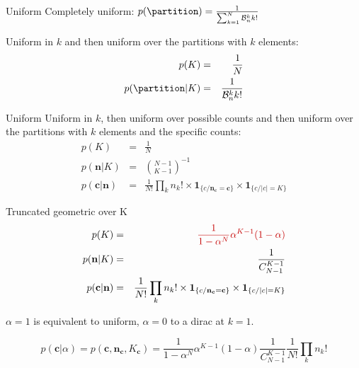 \documentclass[
  ignorenonframetext,
]{beamer}
\newcommand{\Ucolor}[1]{\textcolor[HTML]{c40000}{#1}}
\begin{document}
\begin{frame}{Uniform}
\protect\hypertarget{uniform}{}
Completely uniform:
\(p(\partition)=\frac{1}{\sum_{k=1}^N\mathcal{B}_n^k k!}\)

Uniform in \(k\) and then uniform over the partitions with \(k\)
elements: \begin{eqnarray}
p(K)&=&\frac{1}{N}\\
p(\partition|K)&=&\frac{1}{\mathcal{B}_n^k k!}
\end{eqnarray}
\end{frame}

\begin{frame}{Uniform}
\protect\hypertarget{uniform-1}{}
Uniform in \(k\), then uniform over possible counts and then uniform
over the partitions with \(k\) elements and the specific counts:
\begin{eqnarray}
p(K)&=&\frac{1}{N}\\
p(\mathbf{n}|K)&=&\binom{N-1}{K-1}^{-1}\\
p(\mathbf{c}|\mathbf{n})&=&\frac{1}{N!}\prod_kn_k! \times \mathbf{1}_{\{c / \mathbf{n}_\mathbf{c} = \mathbf{c} \}} \times \mathbf{1}_{\{c / \vert c \vert = K \}}
\end{eqnarray}
\end{frame}

\begin{frame}{Truncated geometric over K}
\protect\hypertarget{truncated-geometric-over-k}{}
\begin{eqnarray}
p(K)&=&\Ucolor{\frac{1}{1-\alpha^N}\alpha^{K-1}(1-\alpha)}\\
p(\mathbf{n}|K)&=&\frac{1}{C_{N-1}^{K-1}}\\
p(\mathbf{c}|\mathbf{n})&=&\frac{1}{N!}\prod_kn_k! \times \mathbf{1}_{\{c / \mathbf{n}_\mathbf{c} = \mathbf{c} \}} \times \mathbf{1}_{\{c / \vert c \vert = K \}}
\end{eqnarray}

\(\alpha=1\) is equivalent to uniform, \(\alpha=0\) to a dirac at
\(k=1\).

\[p(\mathbf{c}|\alpha)= p (\mathbf{c}, \mathbf{n}_\mathbf{c}, K_\mathbf{c}) = \frac{1}{1-\alpha^N}\alpha^{K-1}(1-\alpha)\frac{1}{C_{N-1}^{K-1}}\frac{1}{N!}\prod_kn_k!\]
\end{frame}
\end{document}
